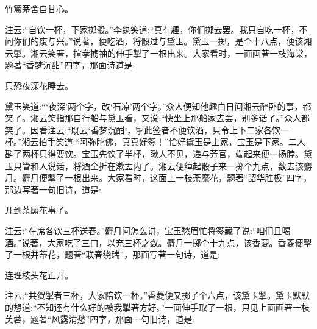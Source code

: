 \begin{poem}
    \begin{pl}竹篱茅舍自甘心。\end{pl}

\end{poem}


\begin{parag}
    注云:“自饮一杯，下家掷骰。”李纨笑道:“真有趣，你们掷去罢。我只自吃一杯，不问你们的废与兴。”说著，便吃酒，将骰过与黛玉。黛玉一掷，是个十八点，便该湘云掣。湘云笑著，揎拳掳袖的伸手掣了一根出来。大家看时，一面画著一枝海棠，题著“香梦沉酣”四字，那面诗道是:
\end{parag}


\begin{poem}
    \begin{pl}只恐夜深花睡去。\end{pl}
\end{poem}


\begin{parag}
    黛玉笑道:“‘夜深’两个字，改‘石凉’两个字。”众人便知他趣白日间湘云醉卧的事，都笑了。湘云笑指那自行船与黛玉看，又说:“快坐上那船家去罢，别多话了。”众人都笑了。因看注云:“既云‘香梦沉酣’，掣此签者不便饮酒，只令上下二家各饮一杯。”湘云拍手笑道:“阿弥陀佛，真真好签！”恰好黛玉是上家，宝玉是下家。二人斟了两杯只得要饮。宝玉先饮了半杯，瞅人不见，递与芳官，端起来便一扬脖。黛玉只管和人说话，将酒全折在漱盂内了。湘云便绰起骰子来一掷个九点，数去该麝月。麝月便掣了一根出来。大家看时，这面上一枝荼縻花，题著“韶华胜极”四字，那边写著一句旧诗，道是:
\end{parag}


\begin{poem}
    \begin{pl}开到荼縻花事了。\end{pl}
\end{poem}


\begin{parag}
    注云:“在席各饮三杯送春。”麝月问怎么讲，宝玉愁眉忙将签藏了说:“咱们且喝酒。”说著，大家吃了三口，以充三杯之数。麝月一掷个十九点，该香菱。香菱便掣了一根并蒂花，题著“联春绕瑞”，那面写著一句诗，道是:
\end{parag}


\begin{poem}
    \begin{pl}连理枝头花正开。\end{pl}
\end{poem}


\begin{parag}
    注云:“共贺掣者三杯，大家陪饮一杯。”香菱便又掷了个六点，该黛玉掣。黛玉默默的想道:“不知还有什么好的被我掣著方好。”一面伸手取了一根，只见上面画著一枝芙蓉，题著“风露清愁”四字，那面一句旧诗，道是:
\end{parag}


